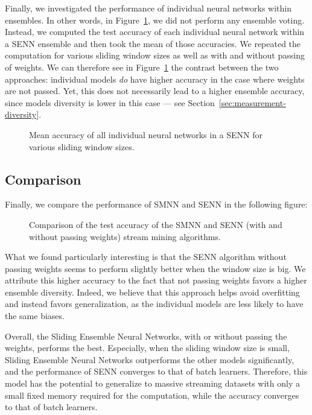 \documentclass[conference]{IEEEtran}
\begin{document}
		Finally, we investigated the performance of individual neural networks within ensembles. In other words, in Figure~\ref{fig:mean-accuracy-individual-models}, we did not perform any ensemble voting. Instead, we computed the test accuracy of each individual neural network within a SENN ensemble and then took the mean of those accuracies. We repeated the computation for various sliding window sizes as well as with and without passing of weights. We can therefore see in Figure~\ref{fig:mean-accuracy-individual-models} the contrast between the two approaches: individual models \emph{do} have higher accuracy in the case where weights are not passed. Yet, this does not necessarily lead to a higher ensemble accuracy, since models diversity is lower in this case --- see Section~\ref{sec:measurement-diversity}.

		\begin{figure}[H]
			\centering
			\caption{Mean accuracy of all individual neural networks in a SENN for various sliding window sizes.}
			\label{fig:mean-accuracy-individual-models}
		\end{figure}
			
		\subsection{Comparison} 
		
		Finally, we compare the performance of SMNN and SENN in the following figure:
		\begin{figure}[H]
			\centering
			\caption{Comparison of the test accuracy of the SMNN and SENN (with and without passing weights) stream mining algorithms.}
			\label{fig:results-trees-ensemble}
		\end{figure}
		
		What we found particularly interesting is that the SENN algorithm without passing weights seems to perform slightly better when the window size is big. We attribute this higher accuracy to the fact that not passing weights favors a higher ensemble diversity. Indeed, we believe that this approach helps avoid overfitting and instead favors generalization, as the individual models are less likely to have the same biases.
		
		Overall, the Sliding Ensemble Neural Networks, with or without passing the weights, performs the best. Especially, when the sliding window size is small, Sliding Ensemble Neural Networks outperforms  the other models significantly, and the performance of SENN converges to that of batch learners. Therefore, this model has the potential to generalize to massive streaming datasets with only a small fixed memory required for the computation, while the accuracy converges to that of batch learners.
		
\end{document}
